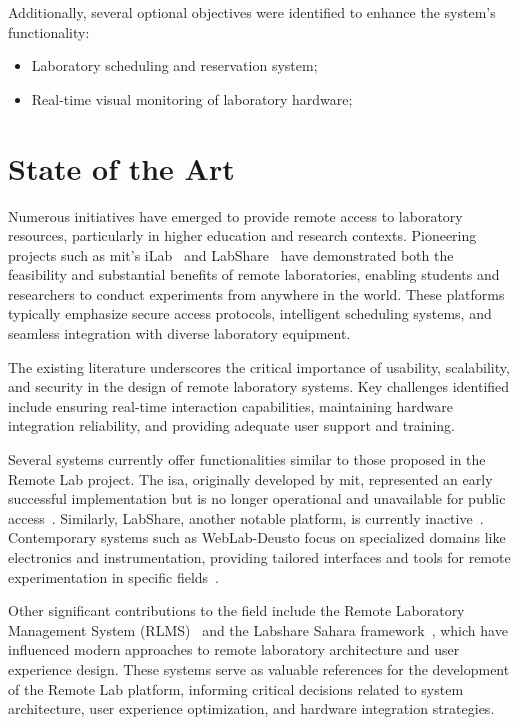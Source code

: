 Additionally, several optional objectives were identified to enhance the system's functionality:
\begin{itemize}
\item Laboratory scheduling and reservation system;
\item Real-time visual monitoring of laboratory hardware;
\end{itemize}

\section{State of the Art}\label{sec:state_of_art}
Numerous initiatives have emerged to provide remote access to laboratory resources, particularly in higher education and research contexts. Pioneering projects such as \acs{mit}'s iLab~\cite{ilab} and LabShare~\cite{labshare} have demonstrated both the feasibility and substantial benefits of remote laboratories, enabling students and researchers to conduct experiments from anywhere in the world. These platforms typically emphasize secure access protocols, intelligent scheduling systems, and seamless integration with diverse laboratory equipment.

The existing literature underscores the critical importance of usability, scalability, and security in the design of remote laboratory systems. Key challenges identified include ensuring real-time interaction capabilities, maintaining hardware integration reliability, and providing adequate user support and training.

Several systems currently offer functionalities similar to those proposed in the Remote Lab project. The \acs{isa}, originally developed by \acs{mit}, represented an early successful implementation but is no longer operational and unavailable for public access~\cite{ilab}. Similarly, LabShare, another notable platform, is currently inactive~\cite{labshare}. Contemporary systems such as WebLab-Deusto focus on specialized domains like electronics and instrumentation, providing tailored interfaces and tools for remote experimentation in specific fields~\cite{weblabdeusto}.

Other significant contributions to the field include the Remote Laboratory Management System (RLMS)~\cite{rlms} and the Labshare Sahara framework~\cite{sahara}, which have influenced modern approaches to remote laboratory architecture and user experience design. These systems serve as valuable references for the development of the Remote Lab platform, informing critical decisions related to system architecture, user experience optimization, and hardware integration strategies.

